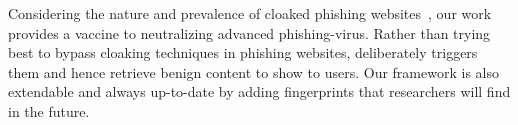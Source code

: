

Considering the nature and prevalence of cloaked phishing websites~\cite{oest2018inside, oest2019phishfarm},
our work provides a vaccine to neutralizing advanced phishing-virus.
Rather than trying best to bypass cloaking techniques in phishing websites, \spartacus deliberately triggers them and hence retrieve benign content to show to users.
Our framework is also extendable and always up-to-date by adding fingerprints that researchers will find in the future.

